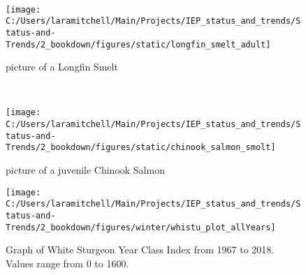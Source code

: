 \documentclass[
]{book}
\begin{document}
\begin{panel-grid}
\begin{columns-nocenter}
\begin{column40}
~

\end{column40}

\begin{column800}

\begin{figure}

{\centering \texttt{[image: C:/Users/laramitchell/Main/Projects/IEP\_status\_and\_trends/Status-and-Trends/2\_bookdown/figures/static/longfin\_smelt\_adult]} 

}

\caption{picture of a Longfin Smelt}\label{fig:unnamed-chunk-171}
\end{figure}

\end{column800}

\begin{column40}

~

\end{column40}

\begin{column800}

\begin{figure}

{\centering \texttt{[image: C:/Users/laramitchell/Main/Projects/IEP\_status\_and\_trends/Status-and-Trends/2\_bookdown/figures/static/chinook\_salmon\_smolt]} 

}

\caption{picture of a juvenile Chinook Salmon}\label{fig:unnamed-chunk-172}
\end{figure}

\end{column800}

\end{columns-nocenter}

\begin{columns-nocenter}

\begin{column800}

\begin{expand}

\begin{figure}
\texttt{[image: C:/Users/laramitchell/Main/Projects/IEP\_status\_and\_trends/Status-and-Trends/2\_bookdown/figures/winter/whistu\_plot\_allYears]} \caption{Graph of White Sturgeon Year Class Index from 1967 to 2018. Values range from 0 to 1600.}\label{fig:unnamed-chunk-173}
\end{figure}


\end{expand}
\end{column800}
\end{columns-nocenter}
\end{panel-grid}
\end{document}
